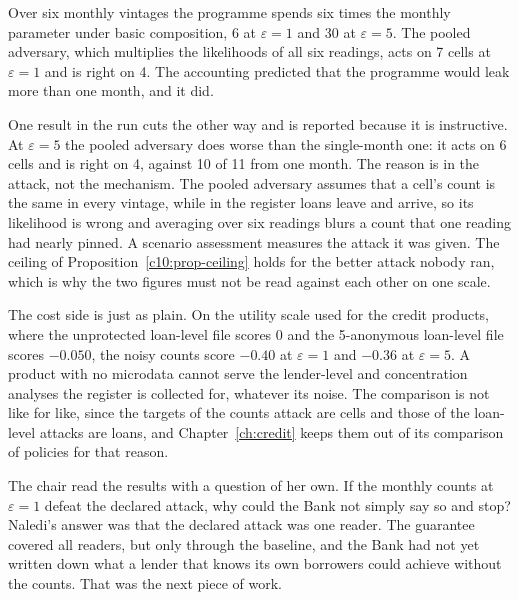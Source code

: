 Over six monthly vintages the programme spends six times the monthly parameter
under basic composition, 6 at $\varepsilon = 1$ and 30 at $\varepsilon = 5$. The
pooled adversary, which multiplies the likelihoods of all six readings, acts on 7
cells at $\varepsilon = 1$ and is right on 4.
The accounting predicted that the programme would leak more than one month, and
it did.

One result in the run cuts the other way and is reported because it is
instructive. At $\varepsilon = 5$ the pooled adversary does worse than the
single-month one: it acts on 6 cells and is right on 4, against 10 of 11 from one
month.
The reason is in the attack, not the mechanism. The pooled adversary assumes that a
cell's count is the same in every vintage, while in the register loans leave and
arrive, so its likelihood is wrong and averaging over six readings blurs a count
that one reading had nearly pinned. A scenario assessment measures the attack it
was given. The ceiling of Proposition~\ref{c10:prop-ceiling} holds for the better
attack nobody ran, which is why the two figures must not be read against each
other on one scale.

The cost side is just as plain. On the utility scale used for the credit products,
where the unprotected loan-level file scores 0 and the 5-anonymous loan-level file
scores $-0.050$, the noisy counts score $-0.40$ at $\varepsilon = 1$ and $-0.36$ at
$\varepsilon = 5$.
A product with no microdata cannot serve the lender-level and concentration
analyses the register is collected for, whatever its noise. The comparison is not
like for like, since the targets of the counts attack are cells and those of the
loan-level attacks are loans, and Chapter~\ref{ch:credit} keeps them out of its
comparison of policies for that reason.

The chair read the results with a question of her own. If the monthly counts at
$\varepsilon = 1$ defeat the declared attack, why could the Bank not simply say so
and stop? Naledi's answer was that the declared attack was one reader. The
guarantee covered all readers, but only through the baseline, and the Bank had not
yet written down what a lender that knows its own borrowers could achieve without
the counts. That was the next piece of work.

